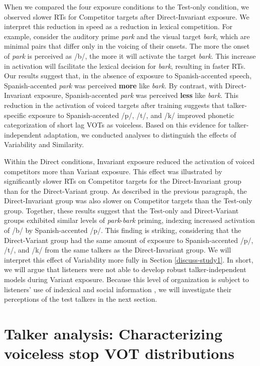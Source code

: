 \documentclass[preprint, 3p, authoryear]{elsarticle} %
\begin{document}
When we compared the four exposure conditions to the Test-only condition, we observed slower RTs for Competitor targets after Direct-Invariant exposure.
We interpret this reduction in speed as a reduction in lexical competition.
For example, consider the auditory prime \emph{park} and the visual target \emph{bark}, which are minimal pairs that differ only in the voicing of their onsets.
The more the onset of \emph{park} is perceived as /b/, the more it will activate the target \emph{bark}.
This increase in activation will facilitate the lexical decision for \emph{bark}, resulting in faster RTs.
Our results suggest that, in the absence of exposure to Spanish-accented speech, Spanish-accented \emph{park} was perceived \textbf{more} like \emph{bark}.
By contrast, with Direct-Invariant exposure, Spanish-accented \emph{park} was perceived \textbf{less} like \emph{bark}.
This reduction in the activation of voiced targets after training suggests that talker-specific exposure to Spanish-accented /p/, /t/, and /k/ improved phonetic categorization of short lag VOTs as voiceless.
Based on this evidence for talker-independent adaptation, we conducted analyses to distinguish the effects of Variability and Similarity.

Within the Direct conditions, Invariant exposure reduced the activation of voiced competitors more than Variant exposure.
This effect was illustrated by significantly slower RTs on Competitor targets for the Direct-Invariant group than for the Direct-Variant group.
As described in the previous paragraph, the Direct-Invariant group was also slower on Competitor targets than the Test-only group.
Together, these results suggest that the Test-only and Direct-Variant groups exhibited similar levels of \emph{park}-\emph{bark} priming, indexing increased activation of /b/ by Spanish-accented /p/.
This finding is striking, considering that the Direct-Variant group had the same amount of exposure to Spanish-accented /p/, /t/, and /k/ from the same talkers as the Direct-Invariant group.
We will interpret this effect of Variability more fully in Section \ref{discuss-study1}.
In short, we will argue that listeners were not able to develop robust talker-independent models during Variant exposure.
Because this level of organization is subject to listeners' use of indexical and social information \citep{kleinschmidt2019}, we will investigate their perceptions of the test talkers in the next section.

\hypertarget{explore-spk}{%
\section{Talker analysis: Characterizing voiceless stop VOT distributions}\label{explore-spk}}
\end{document}
